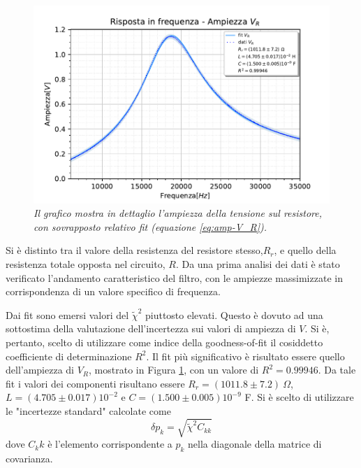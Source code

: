 \begin{figure}[h]
    \centering
    \includegraphics[width=.8\textwidth]{../figs/Risposta-in-frequenza-ampiezza-resistenza.pdf}
    \caption{\emph{Il grafico mostra in dettaglio l'ampiezza della tensione sul resistore, con sovrapposto relativo fit
        (equazione \ref{eq:amp-V_R}).}}\label{fig:ampiezzeR}
\end{figure}

Si è distinto tra il valore della resistenza del resistore stesso,$R_r$, e quello della resistenza totale opposta nel
circuito, $R$.
Da una prima analisi dei dati è stato verificato l'andamento caratteristico del filtro, con le ampiezze massimizzate
in corrispondenza di un valore specifico di frequenza.

Dai fit sono emersi valori del $\tilde{\chi}^2$ piuttosto elevati. Questo è dovuto ad una sottostima della valutazione
dell'incertezza sui valori di ampiezza di $V$. Si è, pertanto, scelto di utilizzare come indice della goodness-of-fit
il cosiddetto coefficiente di determinazione $R^2$.
Il fit più significativo è risultato essere quello dell'ampiezza di $V_R$, mostrato in Figura \ref{fig:ampiezzeR}, con
un valore di $R^2 = 0.99946$. Da tale fit i valori dei componenti risultano essere $R_r = (1011.8 \pm 7.2) \ \Omega$,
$L = (4.705 \pm 0.017)10^{-2}$ e $C = (1.500 \pm 0.005)10^{-9}$ F. Si è scelto di utilizzare le "incertezze
standard" calcolate come
\[
    \delta p_k = \sqrt{\tilde{\chi}^2 C_{kk}}
\]
dove $C_kk$ è l'elemento corrispondente a $p_k$ nella diagonale della matrice di covarianza.

